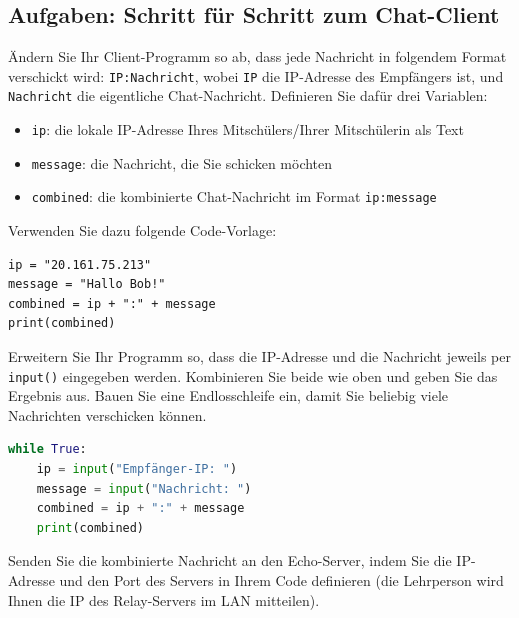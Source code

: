\subsection{Aufgaben: Schritt für Schritt zum Chat-Client}

\begin{myexercise}
    Ändern Sie Ihr Client-Programm so ab, dass jede Nachricht in folgendem Format verschickt wird: \texttt{IP:Nachricht}, wobei \texttt{IP} die IP-Adresse des Empfängers ist, und \texttt{Nachricht} die eigentliche Chat-Nachricht. Definieren Sie dafür drei Variablen:
    \begin{itemize}
        \item \texttt{ip}: die lokale IP-Adresse Ihres Mitschülers/Ihrer Mitschülerin als Text
        \item \texttt{message}: die Nachricht, die Sie schicken möchten
        \item \texttt{combined}: die kombinierte Chat-Nachricht im Format \texttt{ip:message}
    \end{itemize}
    Verwenden Sie dazu folgende Code-Vorlage:
    \begin{lstlisting}
ip = "20.161.75.213"
message = "Hallo Bob!"
combined = ip + ":" + message
print(combined)
\end{lstlisting}
\end{myexercise}

\begin{myexercise}

    Erweitern Sie Ihr Programm so, dass die IP-Adresse und die Nachricht jeweils per \texttt{input()} eingegeben werden. Kombinieren Sie beide wie oben und geben Sie das Ergebnis aus. Bauen Sie eine Endlosschleife ein, damit Sie beliebig viele Nachrichten verschicken können.
    \begin{myanswer}
        \begin{lstlisting}[language=Python]
while True:
    ip = input("Empfänger-IP: ")
    message = input("Nachricht: ")
    combined = ip + ":" + message
    print(combined)
\end{lstlisting}
    \end{myanswer}
\end{myexercise}

\begin{myexercise}
    Senden Sie die kombinierte Nachricht an den Echo-Server, indem Sie die IP-Adresse und den Port des Servers in Ihrem Code definieren (die Lehrperson wird Ihnen die IP des Relay-Servers im \gls{LAN} mitteilen).
\end{myexercise}

